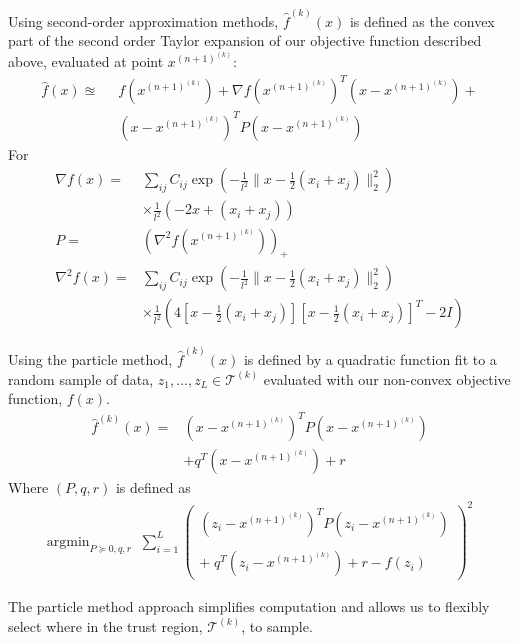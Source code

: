 \documentclass[10pt,twocolumn,letterpaper]{article}
\begin{document}
Using second-order approximation methods, $\hat{f}^{(k)}(x)$ is defined as the convex part of the second order Taylor expansion of our objective function described above, evaluated at point $x^{(n+1)^{(k)}}$:
\begin{align*}
    \hat{f}(x) \approxeq&\;\; f\left(x^{(n+1)^{(k)}}\right) + \nabla f\left(x^{(n+1)^{(k)}}\right)^T\left(x - x^{(n+1)^{(k)}}\right) +\\
     &\;\;\left(x - x^{(n+1)^{(k)}}\right)^T P \left(x - x^{(n+1)^{(k)}}\right)
\end{align*}
For
\begin{align*}
    \nabla f(x) =& \sum_{ij} C_{ij} \exp\left(-\frac{1}{l^2}\lVert x - \frac{1}{2}(x_i + x_j)\rVert ^2_2 \right) \\
    &\times \frac{1}{l^2}\left(-2x + (x_i + x_j)\right)\\
    P =& \left(\nabla^2 f\left(x^{(n+1)^{(k)}}\right)\right)_+\\
    \nabla^2 f(x) =& \sum_{ij} C_{ij} \exp\left(-\frac{1}{l^2}\lVert x - \frac{1}{2}(x_i + x_j)\rVert ^2_2 \right)\\
    &\times \frac{1}{l^2}\left(4 \left[x - \frac{1}{2}(x_i + x_j)\right] \left[x - \frac{1}{2}(x_i + x_j)\right]^T -2I\right)
\end{align*}

Using the particle method, $\hat{f}^{(k)}(x)$ is defined by a quadratic function fit to a random sample of data, $z_1, \dots, z_L \in \mathcal{T}^{(k)}$ evaluated with our non-convex objective function, $f(x)$.
\begin{align*}
    \hat{f}^{(k)}(x) =& \left(x - x^{(n+1)^{(k)}}\right)^T P \left(x - x^{(n+1)^{(k)}}\right)\\
    & + q^T\left(x - x^{(n+1)^{(k)}}\right) + r
\end{align*}
Where $(P, q, r)$ is defined as
\begin{align*}
    \text{argmin}_{P\succeq 0, q, r} \;\;  \sum_{i=1}^L \left(
        \begin{matrix}
            \left(z_i - x^{(n+1)^{(k)}}\right)^TP\left(z_i - x^{(n+1)^{(k)}}\right)\\\\
            +\; q^T\left(z_i - x^{(n+1)^{(k)}}\right) + r - f(z_i)
        \end{matrix} \right)^2
\end{align*}

The particle method approach simplifies computation and allows us to flexibly select where in the trust region, $\mathcal{T}^{(k)}$, to sample.
\end{document}

